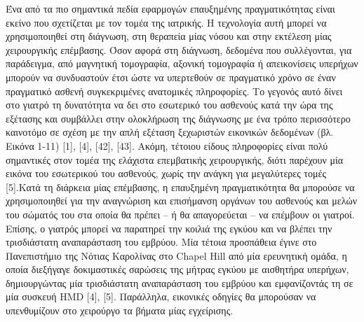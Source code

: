 Ένα από τα πιο σημαντικά πεδία εφαρμογών επαυξημένης πραγματικότητας είναι εκείνο που σχετίζεται με τον τομέα της ιατρικής. Η τεχνολογία αυτή μπορεί να χρησιμοποιηθεί στη διάγνωση, στη θεραπεία μίας νόσου και στην εκτέλεση μίας χειρουργικής επέμβασης. Όσον αφορά στη διάγνωση, δεδομένα που συλλέγονται, για παράδειγμα, από μαγνητική τομογραφία, αξονική τομογραφία ή απεικονίσεις υπερήχων μπορούν να συνδυαστούν έτσι ώστε να υπερτεθούν σε πραγματικό χρόνο σε έναν πραγματικό ασθενή συγκεκριμένες ανατομικές πληροφορίες. Το γεγονός αυτό δίνει στο γιατρό τη δυνατότητα να δει στο εσωτερικό του ασθενούς κατά την ώρα της εξέτασης και συμβάλλει στην ολοκλήρωση της διάγνωσης με ένα τρόπο περισσότερο καινοτόμο σε σχέση με την απλή εξέταση ξεχωριστών εικονικών δεδομένων (βλ. Εικόνα 1-11) [1], [4], [42], [43]. Ακόμη, τέτοιου είδους πληροφορίες είναι πολύ σημαντικές στον τομέα της ελάχιστα επεμβατικής χειρουργικής, διότι
παρέχουν μία εικόνα του εσωτερικού του ασθενούς, χωρίς την ανάγκη για μεγαλύτερες τομές
[5].Κατά τη διάρκεια μίας επέμβασης, η επαυξημένη πραγματικότητα θα μπορούσε να χρησιμοποιηθεί για την αναγνώριση και επισήμανση οργάνων του ασθενούς και μελών του σώματός του στα οποία θα πρέπει – ή θα απαγορεύεται – να επέμβουν οι γιατροί. Επίσης, ο γιατρός μπορεί να παρατηρεί την κοιλιά της εγκύου και να βλέπει την τρισδιάστατη αναπαράσταση του εμβρύου. Μία τέτοια προσπάθεια έγινε στο Πανεπιστήμιο της Νότιας Καρολίνας στο Chapel Hill από μία ερευνητική ομάδα, η οποία διεξήγαγε δοκιμαστικές σαρώσεις της μήτρας εγκύου με αισθητήρα υπερήχων, δημιουργώντας μία τρισδιάστατη αναπαράσταση του εμβρύου και εμφανίζοντάς τη σε μία συσκευή HMD [4], [5]. Παράλληλα, εικονικές οδηγίες θα μπορούσαν να υπενθυμίζουν στο χειρούργο τα βήματα μίας εγχείρισης.


